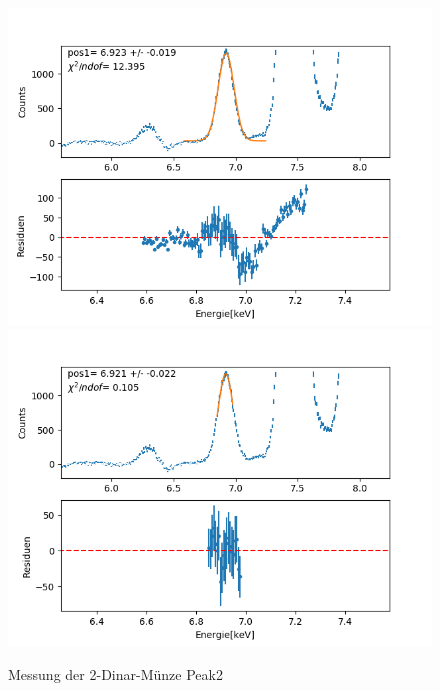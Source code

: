 \documentclass[12pt,a4paper]{article}
\begin{document}
\begin{figure}[H]
\centering
\includegraphics[scale=0.49]{Bilder/roentgen_spektren/denar/den2_1.png}
\includegraphics[scale=0.49]{Bilder/roentgen_spektren/denar/den2_2.png}
\caption{Messung der 2-Dinar-Münze Peak2}
\end{figure}
\end{document}
